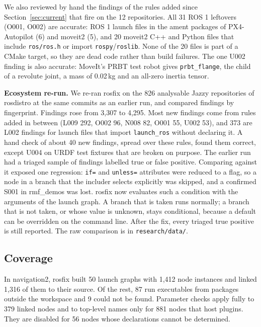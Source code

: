 \documentclass[conference]{IEEEtran}
\newcommand{\code}[1]{\texttt{#1}}
\begin{document}
We also reviewed by hand the findings of the rules added since Section~\ref{sec:current} that
fire on the 12 repositories. All 31 ROS 1 leftovers (O001, O002) are accurate: ROS 1 launch files
in the ament packages of PX4-Autopilot (6) and moveit2 (5), and 20 moveit2 C++ and Python files
that include \code{ros/ros.h} or import \code{rospy}/\code{roslib}. None of the 20 files is part
of a CMake target, so they are dead code rather than build failures. The one U002 finding is
also accurate: MoveIt's PRBT test robot gives \code{prbt\_flange}, the child of a revolute joint,
a mass of 0.02\,kg and an all-zero inertia tensor.

\textbf{Ecosystem re-run.} We re-ran rosfix on the 826 analysable Jazzy repositories of rosdistro
at the same commits as an earlier run, and compared findings by fingerprint. Findings rose from
3{,}307 to 4{,}295. Most new findings come from rules added in between (L009 292, O002 96, N008
82, O001 55, U002 53), and 373 are L002 findings for launch files that import \code{launch\_ros}
without declaring it. A hand check of about 40 new findings, spread over these rules, found them
correct, except U004 on URDF test fixtures that are broken on purpose. The earlier run had a
triaged sample of findings labelled true or false positive. Comparing against it exposed one
regression: \code{if=} and \code{unless=} attributes were reduced to a flag, so a node in a branch
that the includer selects explicitly was skipped, and a confirmed S001 in rmf\_demos was lost.
rosfix now evaluates such a condition with the arguments of the launch graph. A branch that is
taken runs normally; a branch that is not taken, or whose value is unknown, stays conditional,
because a default can be overridden on the command line. After the fix, every triaged true
positive is still reported. The raw comparison is in \code{research/data/}.

\subsection{Coverage}
\label{sec:coverage}

In navigation2, rosfix built 50 launch graphs with 1,412 node instances and linked 1,316 of them
to their source. Of the rest, 87 run executables from packages outside the workspace and 9 could
not be found. Parameter checks apply fully to 379 linked nodes and to top-level names only for 881
nodes that host plugins. They are disabled for 56 nodes whose declarations cannot be determined.
\end{document}
